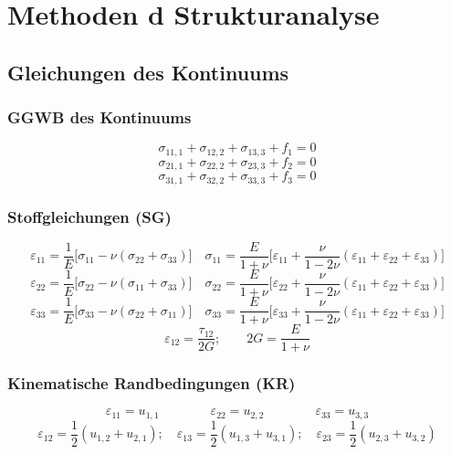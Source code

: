 \section{Methoden d Strukturanalyse}
    \subsection{Gleichungen des Kontinuums}
        \subsubsection{GGWB des Kontinuums}
            \small
            \[\sigma_{11,1} + \sigma_{12,2} + \sigma_{13,3} + f_1 = 0\]
            \[\sigma_{21,1} + \sigma_{22,2} + \sigma_{23,3} + f_2 = 0\]
            \[\sigma_{31,1} + \sigma_{32,2} + \sigma_{33,3} + f_3 = 0\]
            
        \subsubsection{Stoffgleichungen (SG)}
            \[\varepsilon_{11} = \frac{1}{E}\lbrack\sigma_{11} - \nu(\sigma_{22} + \sigma_{33})\rbrack \quad \sigma_{11}=\frac{E}{1+\nu}\lbrack\varepsilon_{11}+\frac{\nu}{1-2\nu}(\varepsilon_{11}+\varepsilon_{22}+\varepsilon_{33})\rbrack\]
            \[\varepsilon_{22} = \frac{1}{E}\lbrack\sigma_{22} - \nu(\sigma_{11} + \sigma_{33})\rbrack \quad \sigma_{22}=\frac{E}{1+\nu}\lbrack\varepsilon_{22}+\frac{\nu}{1-2\nu}(\varepsilon_{11}+\varepsilon_{22}+\varepsilon_{33})\rbrack\]
            \[\varepsilon_{33} = \frac{1}{E}\lbrack\sigma_{33} - \nu(\sigma_{22} + \sigma_{11})\rbrack \quad \sigma_{33}=\frac{E}{1+\nu}\lbrack\varepsilon_{33}+\frac{\nu}{1-2\nu}(\varepsilon_{11}+\varepsilon_{22}+\varepsilon_{33})\rbrack\]
            \[\varepsilon_{12}=\frac{\tau_{12}}{2G}; \qquad 2G=\frac{E}{1+\nu}\]
            
        \subsubsection{Kinematische Randbedingungen (KR)}
            \[\varepsilon_{11} = u_{1,1}\qquad\qquad\varepsilon_{22} = u_{2,2}\qquad\qquad\varepsilon_{33} = u_{3,3}\]
            \[\varepsilon_{12} = \frac{1}{2}(u_{1,2} + u_{2,1});\quad\varepsilon_{13} = \frac{1}{2}(u_{1,3} + u_{3,1});\quad\varepsilon_{23} = \frac{1}{2}(u_{2,3} + u_{3,2})\]
            \normalsize
            \begin{comment}
                \[\varepsilon_{11} = u_{1,1}\quad\quad\quad\quad\varepsilon_{12} = \frac{1}{2}(u_{1,2} + u_{2,1})\]
                \[\varepsilon_{22} = u_{2,2}\quad\quad\quad\quad\varepsilon_{13} = \frac{1}{2}(u_{1,3} + u_{3,1})\]
                \[\varepsilon_{33} = u_{3,3}\quad\quad\quad\quad\varepsilon_{23} = \frac{1}{2}(u_{2,3} + u_{3,2})\]
            \end{comment}
        
    